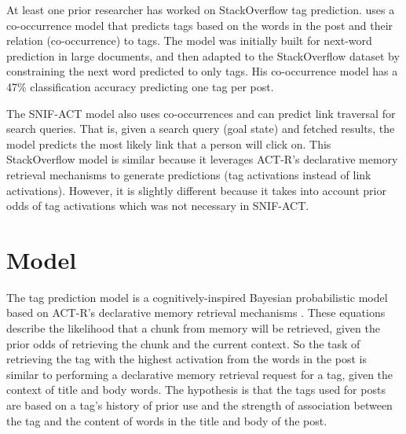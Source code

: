 \documentclass[10pt,letterpaper]{article}
\begin{document}
At least one prior researcher \cite{Kuo2011} has worked on StackOverflow tag prediction.
\citeauthor{Kuo2011} uses a co-occurrence model that predicts tags based on the words in the post and their relation (co-occurrence) to tags.
The model was initially built for next-word prediction in large documents, and then adapted to the StackOverflow dataset by constraining the next word predicted to only tags.
His co-occurrence model has a 47\% classification accuracy predicting one tag per post.

The SNIF-ACT \cite{Fu2007} model also uses co-occurrences and can predict link traversal for search queries.
That is, given a search query (goal state) and fetched results, the model predicts the most likely link that a person will click on.
This StackOverflow model is similar because it leverages ACT-R's declarative memory retrieval mechanisms to generate predictions (tag activations instead of link activations).
However, it is slightly different because it takes into account prior odds of tag activations which was not necessary in SNIF-ACT.

\section{Model}

The tag prediction model is a cognitively-inspired Bayesian probabilistic model based on ACT-R's declarative memory retrieval mechanisms \cite{Anderson2004}.
These equations describe the likelihood that a chunk from memory will be retrieved, given the prior odds of retrieving the chunk and the current context.
So the task of retrieving the tag with the highest activation from the words in the post is similar to performing a declarative memory retrieval request for a tag, given the context of title and body words.
The hypothesis is that the tags used for posts are based on a tag's history of prior use and the strength of association between the tag and the content of words in the title and body of the post.

\vspace{-1em}
\end{document}
